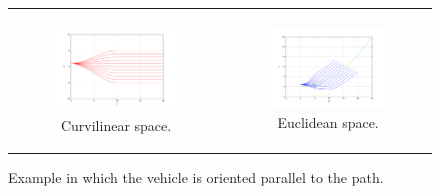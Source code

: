 \begin{figure}[h!]
\centering
\begin{tabular}{cc}
  \begin{subfigure}[b]{0.45\textwidth}
    \centering
    \includegraphics[width=\textwidth, trim=50 40 80 60,clip]{frenet0}
    \caption{Curvilinear space.}
    \label{fig:cp07_frenet_space0}
  \end{subfigure} &
  \begin{subfigure}[b]{0.45\textwidth}
    \centering
    \includegraphics[width=\textwidth, trim=50 40 80 60,clip]{cartesian0}
    \caption{Euclidean space.}
    \label{fig:cp07_cartesian0}
  \end{subfigure}%
\end{tabular}
\caption{Example in which the vehicle is oriented parallel to the path.}\label{fig:cp07_frenet0}
\end{figure}

